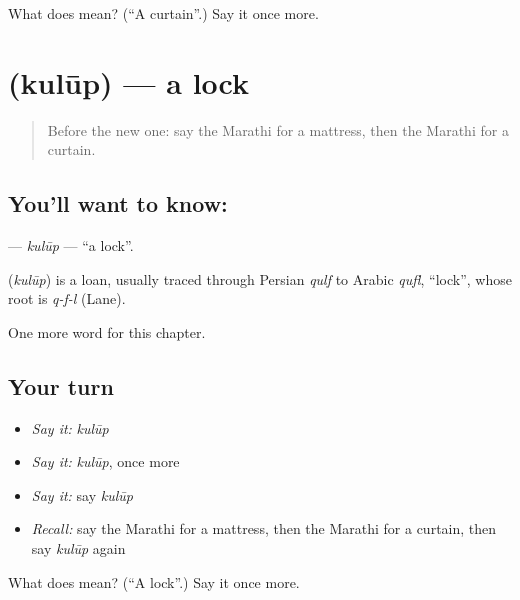 \begin{tcolorbox}[breakable,colback=teal!4,colframe=teal!35!black,title={Before you move on}]
What does  mean? (\textquotedblleft{}A curtain\textquotedblright{}.) Say it once more.
\end{tcolorbox}
\section[\texorpdfstring{\mr{कुलूप} (kulūp)}{कुलूप (kulūp)}]{ (kulūp) — a lock}

\label{lesson:MR-C131-kulup}



\begin{quote}
Before the new one: say the Marathi for a mattress, then the Marathi for a curtain.
\end{quote}

\subsection*{You'll want to know: }
\textbf{} — \emph{kulūp} — \textquotedblleft{}a lock\textquotedblright{}.

\begin{cousinweb}
\textbf{} (\emph{kulūp}) is a loan, usually traced through Persian \emph{qulf} to Arabic \emph{qufl}, \textquotedblleft{}lock\textquotedblright{}, whose root is \emph{q-f-l} (Lane).
\end{cousinweb}

\begin{grammarlens}[title={What you've built}]
One more word for this chapter.
\end{grammarlens}

\subsection*{Your turn}
\begin{itemize}
\raggedright
  \item \emph{Say it:} \emph{kulūp}
  \item \emph{Say it:} \emph{kulūp}, once more
  \item \emph{Say it:} say \emph{kulūp}
  \item \emph{Recall:} say the Marathi for a mattress, then the Marathi for a curtain, then say \emph{kulūp} again
\end{itemize}

\begin{tcolorbox}[breakable,colback=teal!4,colframe=teal!35!black,title={Before you move on}]
What does  mean? (\textquotedblleft{}A lock\textquotedblright{}.) Say it once more.
\end{tcolorbox}
